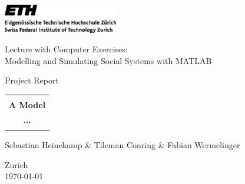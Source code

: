 \thispagestyle{empty}

\begin{center}
\includegraphics[width=5cm]{./titlepage/ETHlogo.eps}

\bigskip


\bigskip


\bigskip


\LARGE{ 	Lecture with Computer Exercises:\\ }
\LARGE{ Modelling and Simulating Social Systems with MATLAB\\}

\bigskip

\bigskip

\small{Project Report}\\

\bigskip

\bigskip

\bigskip

\bigskip


\begin{tabular}{|c|}
\hline
\\
\textbf{\LARGE{A Model }}\\
\textbf{\LARGE{...}}\\
\\
\hline
\end{tabular}
\bigskip

\bigskip

\bigskip

\LARGE{Sebastian Heinekamp \& Tileman Conring \& Fabian Wermelinger}



\bigskip

\bigskip

\bigskip

\bigskip

\bigskip

\bigskip

\bigskip

\bigskip

Zurich\\
\today\\

\end{center}
